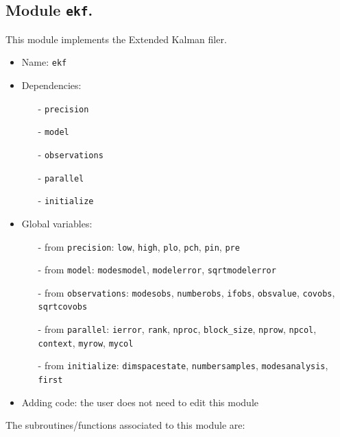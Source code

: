 \documentclass[12pt]{article}
\begin{document}
\subsection{Module {\tt ekf}.}
This module implements the Extended Kalman filer.
\begin{itemize}
\item Name: {\tt ekf}
\item Dependencies: 
\begin{itemize}
\item[-] {\tt precision}
\item[-] {\tt model}
\item[-] {\tt observations}
\item[-] {\tt parallel}
\item[-] {\tt initialize}
\end{itemize}
\item Global variables: 
\begin{itemize}
\item[-] from {\tt precision}: {\tt low}, {\tt high}, {\tt plo}, {\tt pch}, {\tt pin}, {\tt pre} 
\item[-] from {\tt model}: {\tt modesmodel}, {\tt modelerror}, {\tt sqrtmodelerror}
\item[-] from {\tt observations}: {\tt modesobs}, {\tt numberobs}, {\tt ifobs}, {\tt obsvalue}, {\tt covobs}, {\tt sqrtcovobs}
\item[-] from {\tt parallel}: {\tt ierror}, {\tt rank}, {\tt nproc}, {\tt block\_size}, {\tt nprow}, {\tt npcol}, {\tt context}, {\tt myrow}, {\tt mycol}
\item[-] from {\tt initialize}: {\tt dimspacestate}, {\tt numbersamples}, {\tt modesanalysis}, {\tt first}
\end{itemize}
\item Adding code: the user does not need to edit this module
\end{itemize}

The subroutines/functions associated to this module are:
\end{document}
